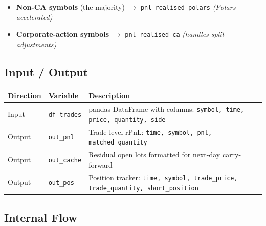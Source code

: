 \documentclass[11pt, a4paper]{article}
\begin{document}
\begin{itemize}[noitemsep]
  \item \textbf{Non-CA symbols} (the majority) $\to$
        \texttt{pnl\_realised\_polars}
        \hfill \emph{(Polars-accelerated)}
  \item \textbf{Corporate-action symbols} $\to$
        \texttt{pnl\_realised\_ca}
        \hfill \emph{(handles split adjustments)}
\end{itemize}

\subsection{Input / Output}

\begin{tabular}{@{}lll@{}}
  \toprule
  Direction & Variable        & Description \\
  \midrule
  Input  & \texttt{df\_trades}   & pandas DataFrame with columns:
                                   \texttt{symbol, time, price, quantity, side} \\
  Output & \texttt{out\_pnl}     & Trade-level rPnL: \texttt{time, symbol, pnl, matched\_quantity} \\
  Output & \texttt{out\_cache}   & Residual open lots formatted for next-day carry-forward \\
  Output & \texttt{out\_pos}     & Position tracker: \texttt{time, symbol, trade\_price,}
                                   \texttt{trade\_quantity, short\_position} \\
  \bottomrule
\end{tabular}

\subsection{Internal Flow}
\end{document}
